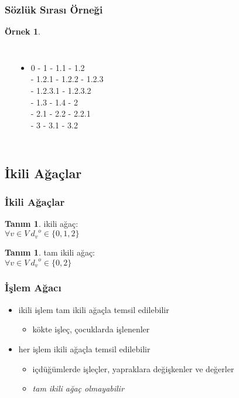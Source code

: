 \documentclass[dvipsnames]{beamer}
\theoremstyle{definition}
\newtheorem{tanim}[theorem]{Tanım}
\theoremstyle{example}
\newtheorem{ornek}[theorem]{Örnek}
\theoremstyle{plain}
\begin{document}
\begin{frame}
  \frametitle{Sözlük Sırası Örneği}

  \begin{ornek}
    \begin{columns}
      \begin{center}
      \end{center}

      \pause
      \begin{itemize}
        \item 0 - 1 - 1.1 - 1.2\\
          - 1.2.1 - 1.2.2 - 1.2.3\\
          - 1.2.3.1 - 1.2.3.2\\
          - 1.3 - 1.4 - 2\\
          - 2.1 - 2.2 - 2.2.1\\
          - 3 - 3.1 - 3.2
      \end{itemize}
    \end{columns}
  \end{ornek}
\end{frame}

\subsection{İkili Ağaçlar}

\begin{frame}
  \frametitle{İkili Ağaçlar}

  \begin{tanim}
    \alert{ikili ağaç}:\\
    $\forall v \in V~{d_v}^o \in \{0,1,2\}$
  \end{tanim}

  \pause
  \begin{tanim}
    \alert{tam ikili ağaç}:\\
    $\forall v \in V~{d_v}^o \in \{0,2\}$
  \end{tanim}
\end{frame}

\begin{frame}
  \frametitle{İşlem Ağacı}

  \begin{itemize}
    \item ikili işlem tam ikili ağaçla temsil edilebilir
    \begin{itemize}
      \item kökte işleç, çocuklarda işlenenler
    \end{itemize}

    \pause
    \medskip
    \item her işlem ikili ağaçla temsil edilebilir
    \begin{itemize}
      \item içdüğümlerde işleçler, yapraklara değişkenler ve değerler
      \item \emph{tam ikili ağaç olmayabilir}
    \end{itemize}
  \end{itemize}
\end{frame}
\end{document}

